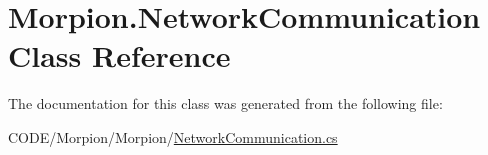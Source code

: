 \hypertarget{class_morpion_1_1_network_communication}{}\section{Morpion.\+Network\+Communication Class Reference}
\label{class_morpion_1_1_network_communication}


The documentation for this class was generated from the following file\+:\begin{DoxyCompactItemize}
\item 
C\+O\+D\+E/\+Morpion/\+Morpion/\hyperlink{_network_communication_8cs}{Network\+Communication.\+cs}\end{DoxyCompactItemize}
